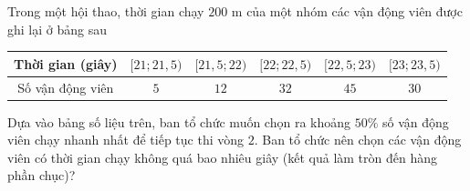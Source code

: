\begin{bt}%
	Trong một hội thao, thời gian chạy $200$ m của một nhóm các vận động viên được ghi lại ở bảng sau
	\begin{center}
		\begin{tabular}{|c|c|c|c|c|c|}
			\hline
			Thời gian (giây) &$[21;21{,}5)$& $[21{,}5;22)$ &$[22;22{,}5)$&$[22{,}5;23)$ &$[23;23{,}5)$\\
			\hline
			Số vận động viên & $5$ & $12$ & $32$ & $45$ & $30$ \\
			\hline
		\end{tabular}
	\end{center}
	Dựa vào bảng số liệu trên, ban tổ chức muốn chọn ra khoảng $50\%$ số vận động viên chạy nhanh nhất để tiếp tục thi vòng $2$. Ban tổ chức nên chọn các vận động viên có thời gian chạy không quá bao nhiêu giây (kết quả làm tròn đến hàng phần chục)?
\end{bt}


